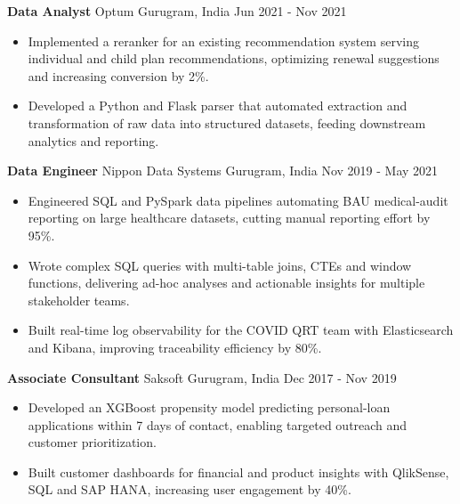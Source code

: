 \documentclass[10pt,a4paper]{article}
\newcommand{\role}[4]{\textbf{#1} \textbar{} #2 \hfill #3 \textbar{} #4\par}
\begin{document}
\vspace{3pt}
\role{Data Analyst}{Optum}{Gurugram, India}{Jun 2021 - Nov 2021}
\begin{itemize}
  \item Implemented a reranker for an existing recommendation system serving individual and child plan recommendations, optimizing renewal suggestions and increasing conversion by 2\%.
  \item Developed a Python and Flask parser that automated extraction and transformation of raw data into structured datasets, feeding downstream analytics and reporting.
\end{itemize}
\vspace{3pt}
\role{Data Engineer}{Nippon Data Systems}{Gurugram, India}{Nov 2019 - May 2021}
\begin{itemize}
  \item Engineered SQL and PySpark data pipelines automating BAU medical-audit reporting on large healthcare datasets, cutting manual reporting effort by 95\%.
  \item Wrote complex SQL queries with multi-table joins, CTEs and window functions, delivering ad-hoc analyses and actionable insights for multiple stakeholder teams.
  \item Built real-time log observability for the COVID QRT team with Elasticsearch and Kibana, improving traceability efficiency by 80\%.
\end{itemize}
\vspace{3pt}
\role{Associate Consultant}{Saksoft}{Gurugram, India}{Dec 2017 - Nov 2019}
\begin{itemize}
  \item Developed an XGBoost propensity model predicting personal-loan applications within 7 days of contact, enabling targeted outreach and customer prioritization.
  \item Built customer dashboards for financial and product insights with QlikSense, SQL and SAP HANA, increasing user engagement by 40\%.
\end{itemize}
\end{document}
